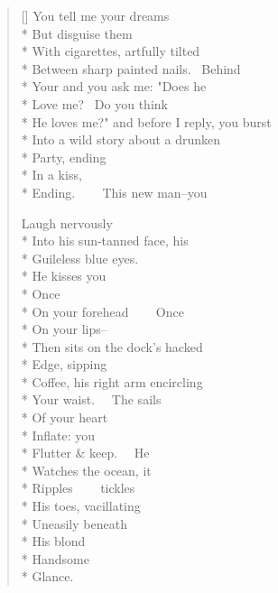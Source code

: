 \label{ch:what_i_mean_to_ask}
\settowidth{\versewidth}{He loves me?" and before I reply, you burst}
\begin{verse}[\versewidth]
You tell me your dreams\\*
But disguise them\\*
With cigarettes, artfully tilted\\*
Between sharp painted nails.  Behind\\*
Your and you ask me: "Does he\\*
Love me?  Do you think\\*
He loves me?" and before I reply, you burst\\*
Into a wild story about a drunken\\*
Party, ending\\*
In a kiss,\\*
Ending.     This new man--you

Laugh nervously\\*
Into his sun-tanned face, his\\*
Guileless blue eyes.\\*
He kisses you\\*
Once\\*
On your forehead     Once\\*
On your lips--\\*
Then sits on the dock's hacked\\*
Edge, sipping\\*
Coffee, his right arm encircling\\*
Your waist.   The sails\\*
Of your heart\\*
Inflate: you\\*
Flutter \& keep.   He\\*
Watches the ocean, it\\*
Ripples     tickles\\*
His toes, vacillating\\*
Uneasily beneath\\*
His blond\\*
Handsome\\*
Glance.
\end{verse}
